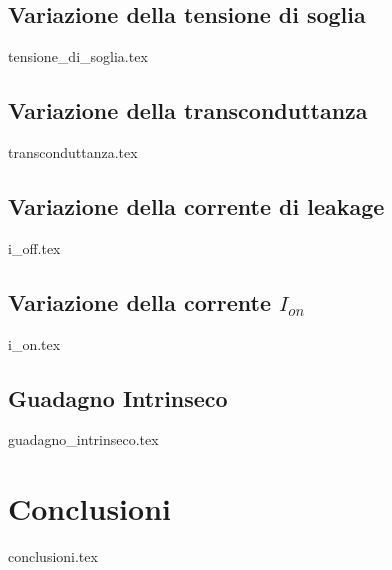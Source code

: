 \documentclass[
	a4paper,
	cleardoublepage=empty,
	headings=twolinechapter,
	numbers=autoenddot,
]{scrbook}
\begin{document}
\section{Variazione della tensione di soglia}
\label{cap2:vth}
{tensione_di_soglia.tex}

\section{Variazione della transconduttanza}\label{sec:transconduttanza}
{transconduttanza.tex}

\section{Variazione della corrente di leakage}
{i_off.tex}

\section{Variazione della corrente $I_{on}$}
{i_on.tex}

\section{Guadagno Intrinseco}
{guadagno_intrinseco.tex}


\chapter*{Conclusioni}
{conclusioni.tex}

\backmatter




\end{document}
